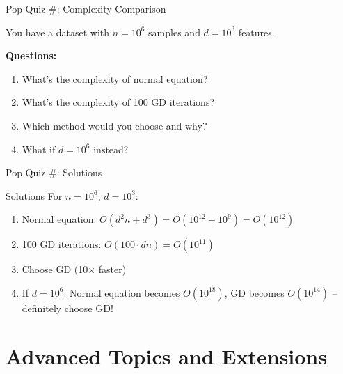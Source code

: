 \documentclass[usenames,dvipsnames]{beamer}
\begin{document}
  \begin{frame}{Pop Quiz \#\thepopquiz: Complexity Comparison}
    \begin{popquizbox}{\thepopquiz}
    You have a dataset with $n = 10^6$ samples and $d = 10^3$ features.
    
    \textbf{Questions:}
    \begin{enumerate}
        \item What's the complexity of normal equation?
        \item What's the complexity of 100 GD iterations?
        \item Which method would you choose and why?
        \item What if $d = 10^6$ instead?
    \end{enumerate}
    \end{popquizbox}
  \end{frame}

  \begin{frame}{Pop Quiz \#\thepopquiz: Solutions}
    \begin{examplebox}{Solutions}
    For $n = 10^6$, $d = 10^3$:
    \begin{enumerate}
        \item Normal equation: $O(d^2n + d^3) = O(10^{12} + 10^9) = O(10^{12})$
        \item 100 GD iterations: $O(100 \cdot dn) = O(10^{11})$
        \item Choose GD (10× faster)
        \item If $d = 10^6$: Normal equation becomes $O(10^{18})$, GD becomes $O(10^{14})$ – definitely choose GD!
    \end{enumerate}
    \end{examplebox}
  \end{frame}

  \section{Advanced Topics and Extensions}
\end{document}

